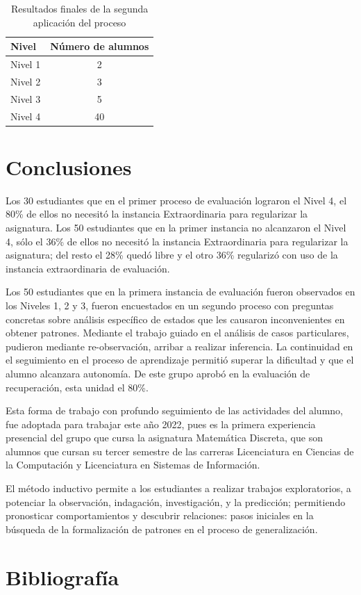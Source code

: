 \documentclass[oneside,spanish]{amsart}
\numberwithin{equation}{section}
\theoremstyle{definition}
\begin{document}
\begin{table}[h]
	\centering
	\def\arraystretch{1.25}
	\begin{tabular}[h]{|l|c|}
		\hline
		Nivel	&	Número de alumnos\\\hline
		Nivel 1	&	2\\\hline
		Nivel 2	&	3\\\hline
		Nivel 3	&	5\\\hline
		Nivel 4	&	40\\
		\hline
	\end{tabular}
	\caption{Resultados finales de la segunda aplicación del proceso}
	\label{tab:2}
\end{table}

\section{Conclusiones}

Los 30 estudiantes que en el primer proceso de evaluación lograron el Nivel 4, el 80\% de ellos no necesitó la instancia Extraordinaria para regularizar la asignatura. Los 50 estudiantes que en la primer instancia no alcanzaron el Nivel 4, sólo el 36\% de ellos no necesitó la instancia Extraordinaria para regularizar la asignatura; del resto el 28\% quedó libre y el otro 36\% regularizó con uso de la instancia extraordinaria de evaluación.

Los 50 estudiantes que en la primera instancia de evaluación fueron observados en los Niveles 1, 2 y 3, fueron encuestados en un segundo proceso con preguntas concretas sobre análisis específico de estados que les causaron inconvenientes en obtener patrones. Mediante el trabajo guiado en el análisis de casos particulares, pudieron mediante re-observación, arribar a realizar inferencia. La continuidad en el seguimiento en el proceso de aprendizaje permitió superar la dificultad y que el alumno alcanzara autonomía. De este grupo aprobó en la evaluación de recuperación, esta unidad el 80\%.

Esta forma de trabajo con profundo seguimiento de las actividades del alumno, fue adoptada para trabajar este año 2022, pues es la primera experiencia presencial del grupo que cursa la asignatura Matemática Discreta, que son alumnos que cursan su tercer semestre de las carreras Licenciatura en Ciencias de la Computación y Licenciatura en Sistemas de Información.

El método inductivo permite a los estudiantes a realizar trabajos exploratorios, a potenciar la observación, indagación, investigación, y la predicción; permitiendo pronosticar comportamientos y descubrir relaciones: pasos iniciales en la búsqueda de la formalización de patrones en el proceso de generalización.

\section{Bibliografía}

\nocite{*}
\printbibliography
\end{document}
